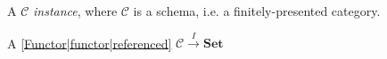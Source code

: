 
A $\mathcal{C}$ \emph{instance}, where $\mathcal{C}$ is a schema, i.e. a finitely-presented category.

A \ref{Functor|functor|referenced} $\mathcal{C} \xrightarrow{I} \mathbf{Set}$
